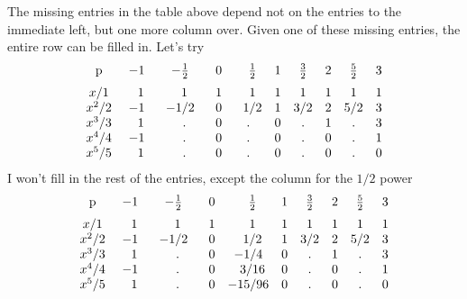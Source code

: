 \documentclass[11pt, oneside]{article}
\begin{document}
The missing entries in the table above depend not on the entries to the immediate left, but one more column over.  Given one of these missing entries, the entire row can be filled in.  Let's try
\[
\begin{matrix}
\text{p}  \vspace{2 mm} \\
x/1  \\
x^2/2 \\
x^3/3 \\
x^4/4 \\
x^5/5
\end{matrix} \ \ \ \
\begin{matrix}
-1 & -\frac{1}{2} & 0& \ \ \frac{1}{2} & 1& \frac{3}{2}  & 2 & \frac{5}{2}  & 3   \vspace{2 mm}  \\
\ \ 1 & \ \ 1 & 1 & \ \ 1 & 1 & 1 & 1 & 1 & 1 \\
-1 & \ \ -1/2 \ \ & 0 & \ \ 1/2 & 1 & 3/2 & 2 & 5/2 & 3 \\
\ \ 1 & \ \ . & 0 &  . & 0 & . & 1 & . & 3 \\
-1 &  \ \ .  & 0 & . & 0 & . & 0 & . & 1 \\
\ \ 1 &  \ \ . & 0 & . & 0 & . & 0 & . & 0 \\
\end{matrix}
\]
I won't fill in the rest of the entries, except the column for the $1/2$ power
\[
\begin{matrix}
\text{p}  \vspace{2 mm} \\
x/1  \\
x^2/2 \\
x^3/3 \\
x^4/4 \\
x^5/5
\end{matrix} \ \ \ \
\begin{matrix}
-1 & -\frac{1}{2} & 0& \ \ \frac{1}{2} & 1& \frac{3}{2}  & 2 & \frac{5}{2}  & 3   \vspace{2 mm}  \\
\ \ 1 & \ \ 1 & 1 & \ \ 1 & 1 & 1 & 1 & 1 & 1 \\
-1 & \ \ -1/2 \ \ & 0 & \ \ 1/2 & 1 & 3/2 & 2 & 5/2 & 3 \\
\ \ 1 & \ \ . & 0 &  -1/4 & 0 & . & 1 & . & 3 \\
-1 &  \ \ .  & 0 & \ \ 3/16 & 0 & . & 0 & . & 1 \\
\ \ 1 &  \ \ . & 0 & -15/96 & 0 & . & 0 & . & 0 \\
\end{matrix}
\]
\end{document}
